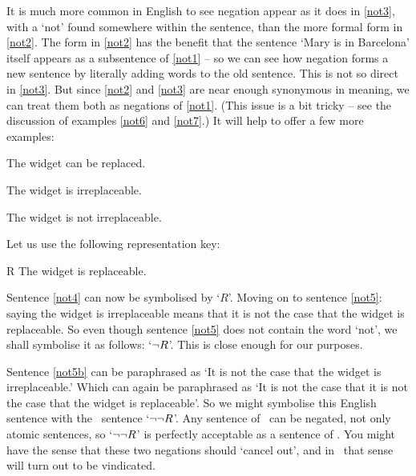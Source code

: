 It is much more common in English to see negation appear as it does in \ref{not3}, with a `not' found somewhere within the sentence, than the more formal form in \ref{not2}. The form in \ref{not2} has the benefit that the sentence `Mary is in Barcelona' itself appears as a subsentence of \ref{not1} – so we can see how negation forms a new sentence by literally adding words to the old sentence. This is not so direct in \ref{not3}. But since \ref{not2} and \ref{not3} are near enough synonymous in meaning, we can treat them both as negations of \ref{not1}. (This issue is a bit tricky – see the discussion of examples \ref{not6} and \ref{not7}.)
It will help to offer a few more examples:
	\begin{earg}
		\item[\ex{not4}] The widget can be replaced.
		\item[\ex{not5}] The widget is irreplaceable.
		\item[\ex{not5b}] The widget is not irreplaceable.
	\end{earg}
Let us use the following representation key:
	\begin{ekey}
		\item[R] The widget is replaceable.
	\end{ekey}
Sentence \ref{not4} can now be symbolised by `$R$'. Moving on to sentence \ref{not5}: saying the widget is irreplaceable means that it is not the case that the widget is replaceable. So even though sentence \ref{not5} does not contain the word `not', we shall symbolise it as follows: `$\neg R$'. This is close enough for our purposes.

Sentence \ref{not5b} can be paraphrased as `It is not the case that the widget is irreplaceable.' Which can again be paraphrased as `It is not the case that it is not the case that the widget is replaceable'. So we might symbolise this English sentence with the \TFL\ sentence `$\neg\neg R$'. Any sentence of \TFL\ can be negated, not only atomic sentences, so `$\neg\neg R$' is perfectly acceptable as a sentence of \TFL. You might have the sense that these two negations should `cancel out', and in \TFL\ that sense will turn out to be vindicated.

